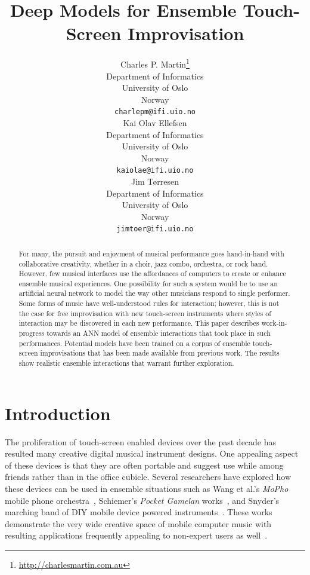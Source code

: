 \documentclass{article}
\title{Deep Models for Ensemble Touch-Screen Improvisation}
\author{
  Charles P. Martin\thanks{\url{http://charlesmartin.com.au}}\\
  Department of Informatics\\
  University of Oslo\\
  Norway\\
  \texttt{charlepm@ifi.uio.no}\\
  \And
  Kai Olav Ellefsen \\
  Department of Informatics\\
  University of Oslo\\
  Norway\\
  \texttt{kaiolae@ifi.uio.no}\\
  \And
  Jim T{\o}rresen\\
  Department of Informatics\\
  University of Oslo\\
  Norway\\
  \texttt{jimtoer@ifi.uio.no}\\
}
\begin{document}
\maketitle

\begin{abstract}
  For many, the pursuit and enjoyment of musical performance goes
  hand-in-hand with collaborative creativity, whether in a choir,
  jazz combo, orchestra, or rock band. However, few musical interfaces
  use the affordances of computers to create or enhance ensemble
  musical experiences. One possibility for such a system would be to
  use an artificial neural network to model the way other musicians
  respond to single performer. Some forms of music have
  well-understood rules for interaction; however, this is not the case
  for free improvisation with new touch-screen instruments where
  styles of interaction may be discovered in each new performance.
  This paper describes work-in-progress towards an ANN model of
  ensemble interactions that took place in such performances.
  Potential models have been trained on a corpus of ensemble
  touch-screen improvisations that has been made available from
  previous work. The results show realistic ensemble interactions that
  warrant further exploration.
\end{abstract}

\section{Introduction}

The proliferation of touch-screen enabled devices over the past decade
has resulted many creative digital musical instrument designs. One
appealing aspect of these devices is that they are often portable and
suggest use while among friends rather than in the office cubicle.
Several researchers have explored how these devices can be used in
ensemble situations such as Wang et al.'s \emph{MoPho} mobile phone
orchestra~\cite{Wang:2014cs}, Schiemer's \emph{Pocket Gamelan}
works~\cite{Greg-Schiemer:2007mz}, and Snyder's marching band of DIY
mobile device powered instruments~\cite{Snyder:2014dp}. These works
demonstrate the very wide creative space of mobile computer music with
resulting applications frequently appealing to non-expert users as
well~\cite{Wang:2014ul, Hamilton:2011aa}.
\end{document}
